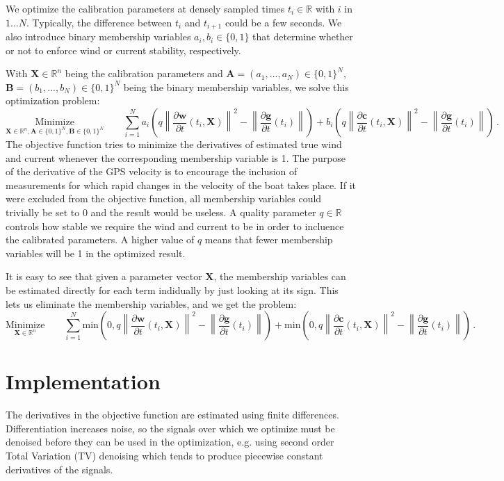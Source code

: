 \documentclass{article}
\newcommand{\minfun}{\text{min}}
\newcommand{\realvec}[1]{\mathbf{#1}}
\newcommand{\norm}[1]{\left\| #1 \right\|}
\newcommand{\derivative}[2]{\frac{\partial #1}{\partial #2}}
\newcommand{\timederivative}[1]{\derivative{#1}{t}}
\newcommand{\realnumber}{\mathbb{R}}
\begin{document}
We optimize the calibration parameters at densely sampled times $t_i \in \realnumber$ with $i$ in $1 \ldots N$. Typically, the difference between $t_i$ and $t_{i+1}$ could be a few seconds. We also introduce binary membership variables $a_i, b_i \in \{0, 1\}$ that determine whether or not to enforce wind or current stability, respectively.

With $\realvec{X} \in \realnumber^n$ being the calibration parameters and $\realvec{A} = (a_1, ..., a_N) \in \{0, 1\}^N$, $\realvec{B} = (b_1, ..., b_N) \in \{0, 1\}^N$ being the binary membership variables, we solve this optimization problem:
\begin{displaymath}
\underset{\realvec{X} \in \realnumber^n, \realvec{A} \in \{0, 1\}^N, \realvec{B} \in \{0, 1\}^N}{\text{Minimize}} \qquad \sum_{i = 1}^N  a_i\left(  q\norm{\timederivative{\realvec{w}}(t_i, \realvec{X})}^2 - \norm{\timederivative{\realvec{g}}(t_i)} \right)
+ b_i\left( q\norm{\timederivative{\realvec{c}}(t_i, \realvec{X})}^2 - \norm{\timederivative{\realvec{g}}(t_i)}\right) \, .
\end{displaymath}
The objective function tries to minimize the derivatives of estimated true wind and current whenever the corresponding membership variable is 1. The purpose of the derivative of the GPS velocity is to encourage the inclusion of measurements for which rapid changes in the velocity of the boat takes place. If it were excluded from the objective function, all membership variables could trivially be set to 0 and the result would be useless. A quality parameter $q \in \realnumber$ controls how stable we require the wind and current to be in order to incluence the calibrated parameters. A higher value of $q$ means that fewer membership variables will be 1 in the optimized result.

It is easy to see that given a parameter vector $\realvec{X}$, the membership variables can be estimated directly for each term indidually by just looking at its sign. This lets us eliminate the membership variables, and we get the problem:
\begin{displaymath}
\underset{\realvec{X} \in \realnumber^n}{\text{Minimize}} \qquad \sum_{i = 1}^N  \minfun\left(0, q\norm{\timederivative{\realvec{w}}(t_i, \realvec{X})}^2 - \norm{\timederivative{\realvec{g}}(t_i)}\right)
+ \minfun\left(0, q\norm{\timederivative{\realvec{c}}(t_i, \realvec{X})}^2 - \norm{\timederivative{\realvec{g}}(t_i)}\right) \, .
\end{displaymath}


\section{Implementation}
The derivatives in the objective function are estimated using finite differences. Differentiation increases noise, so the signals over which we optimize must be denoised before they can be used in the optimization, e.g. using second order Total Variation (TV) denoising which tends to produce piecewise constant derivatives of the signals.
\end{document}
